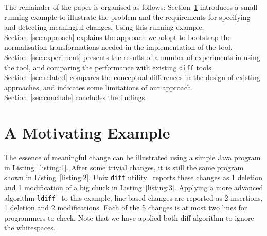 \documentclass[10pt, conference, compsocconf]{IEEEtran}
\begin{document}
The remainder of the paper is organised as follows: Section~\ref{sec:background} introduces a small running example to illustrate the problem and the requirements for specifying and detecting meaningful changes. Using this running example, Section~\ref{sec:approach} explains the approach we adopt to bootstrap the normalisation transformations needed in the implementation of the tool. 
Section~\ref{sec:experiment} presents the results of a number of experiments in using the tool, and comparing the performance with existing {\tt diff} tools. Section~\ref{sec:related} compares the conceptual differences in the design of existing approaches, and indicates some limitations of our approach. Section~\ref{sec:conclude} concludes the findings.

\section{A Motivating Example}\label{sec:background}
The essence of meaningful change can be illustrated using a simple Java program in Listing~\ref{listing:1}.
After some trivial changes, it is still the same program shown in Listing~\ref{listing:2}.
Unix {\tt diff} utility~\cite{diff} reports these changes as 1 deletion and 1 modification of a big chuck in Listing~\ref{listing:3}. Applying a more advanced algorithm {\tt ldiff}~\cite{canfora09software} to this example, line-based changes are reported as 2 insertions, 1 deletion and 2 modifications. Each of the 5 changes is at most two lines for programmers to check. Note that we have applied both diff algorithm to ignore the whitespaces. 





\end{document}

